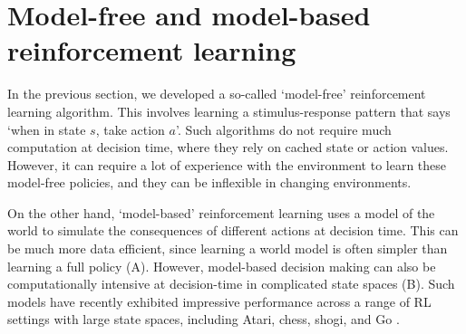 \section{Model-free and model-based reinforcement learning}

In the previous section, we developed a so-called `model-free' reinforcement learning algorithm.
This involves learning a stimulus-response pattern that says `when in state $s$, take action $a$'.
Such algorithms do not require much computation at decision time, where they rely on cached state or action values.
However, it can require a lot of experience with the environment to learn these model-free policies, and they can be inflexible in changing environments.

On the other hand, `model-based' reinforcement learning uses a model of the world to simulate the consequences of different actions at decision time.
This can be much more data efficient, since learning a world model is often simpler than learning a full policy (A).
However, model-based decision making can also be computationally intensive at decision-time in complicated state spaces (B).
Such models have recently exhibited impressive performance across a range of RL settings with large state spaces, including Atari, chess, shogi, and Go \citep{silver2018general, schrittwieser2020mastering, deisenroth2011pilco}.

